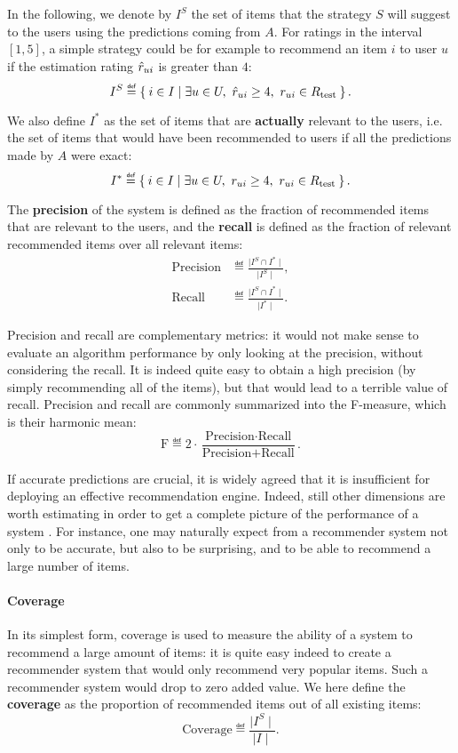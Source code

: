 In the following, we denote by $I^S$ the set of items that the strategy $S$
will suggest to the users using the predictions coming from $A$. For
ratings in the interval $[1, 5]$, a simple strategy could be for example to
recommend an item $i$ to user $u$ if the estimation rating $\hat{r}_{ui}$ is
greater than $4$:
$$I^S \eqdef \Set{i \in I | \exists u \in U, ~\predrui \geq 4,~ \rui \in \Rtest}.$$

We also define $I^*$ as the set of items that are \textbf{actually} relevant to
the users, i.e.  the set of items that would have been recommended to users if
all the predictions made by $A$ were exact:
$$I^* \eqdef \Set{i \in I | \exists u \in U, ~\rui \geq 4,~ \rui \in \Rtest}.$$

\noindent
The \textbf{precision} of the
system is
defined as the fraction of recommended items that are relevant to the users,
and the \textbf{recall} is defined as the fraction of relevant recommended
items over all relevant items:
\begin{align*}
  \text{Precision} &\eqdef \frac{\mid I^S \cap I^*\mid}{\mid I^S \mid},\\
  \text{Recall} &\eqdef \frac{\mid I^S \cap I^*\mid}{\mid I^* \mid}.
\end{align*}

Precision and recall are complementary metrics: it would not make sense to
evaluate an algorithm performance by only looking at the precision, without
considering the recall. It is indeed quite easy to obtain a high precision (by
simply recommending all of the items), but that would lead to a terrible
value of recall. Precision and recall are commonly summarized into the
F-measure, which is their harmonic mean:
  $$
  \text{F} \eqdef 2 \cdot \frac{\text{Precision} \cdot
  \text{Recall}}{\text{Precision} + \text{Recall}}.
  $$

If accurate predictions are crucial, it is widely agreed that it is
insufficient for deploying an effective recommendation engine. Indeed, still
other dimensions are worth estimating in order to get a complete picture of the
performance of a system
\cite{NeeRieKonACM2006,HerKonJohTerRieACM2004,KamBriRecSys2014}.  For instance,
one may naturally expect from a recommender system not only to be accurate, but
also to be surprising, and to be able to recommend a large number of items.

\paragraph{Coverage\\}
In its simplest form, coverage is used to measure the ability of a system to
recommend a large amount of items: it is quite easy indeed to create a
recommender system that would only recommend very popular items. Such a
recommender system would drop to zero added value. We here define the
\textbf{coverage} as the proportion of recommended items out of all existing
items:
$$\text{Coverage} \eqdef \frac{\mid I^S\mid}{\mid I\mid}.$$

